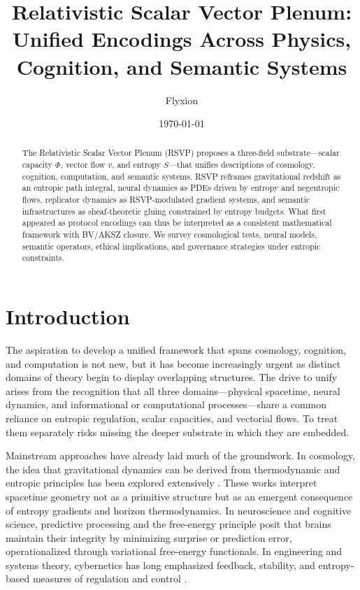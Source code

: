 \documentclass[12pt]{article}
\title{Relativistic Scalar Vector Plenum: Unified Encodings Across Physics, Cognition, and Semantic Systems}
\author{Flyxion}
\date{\today}
\begin{document}
\maketitle

\begin{abstract}
The Relativistic Scalar Vector Plenum (RSVP) proposes a three-field substrate---scalar capacity $\Phi$, vector flow $v$, and entropy $S$---that unifies descriptions of cosmology, cognition, computation, and semantic systems. RSVP reframes gravitational redshift as an entropic path integral, neural dynamics as PDEs driven by entropy and negentropic flows, replicator dynamics as RSVP-modulated gradient systems, and semantic infrastructures as sheaf-theoretic gluing constrained by entropy budgets. What first appeared as protocol encodings can thus be interpreted as a consistent mathematical framework with BV/AKSZ closure. We survey cosmological tests, neural models, semantic operators, ethical implications, and governance strategies under entropic constraints.
\end{abstract}


\section{Introduction}

The aspiration to develop a unified framework that spans cosmology, cognition, and computation is not new, but it has become increasingly urgent as distinct domains of theory begin to display overlapping structures. The drive to unify arises from the recognition that all three domains---physical spacetime, neural dynamics, and informational or computational processes---share a common reliance on entropic regulation, scalar capacities, and vectorial flows. To treat them separately risks missing the deeper substrate in which they are embedded.  

Mainstream approaches have already laid much of the groundwork. In cosmology, the idea that gravitational dynamics can be derived from thermodynamic and entropic principles has been explored extensively \cite{Jacobson:1995ab,Verlinde:2010hp,Padmanabhan:2009vy,Carney2022}. These works interpret spacetime geometry not as a primitive structure but as an emergent consequence of entropy gradients and horizon thermodynamics. In neuroscience and cognitive science, predictive processing and the free-energy principle \cite{Friston:2009ze,Hohwy2013,ParrPezzuloFriston2022} posit that brains maintain their integrity by minimizing surprise or prediction error, operationalized through variational free-energy functionals. In engineering and systems theory, cybernetics has long emphasized feedback, stability, and entropy-based measures of regulation and control \cite{Wiener1948,Ashby1956}.  
\end{document}
